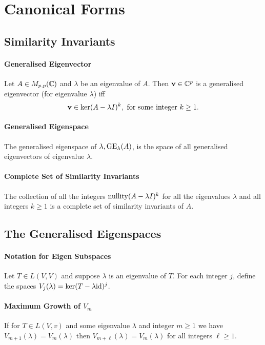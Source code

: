 \section{Canonical Forms}

\subsection{Similarity Invariants}
\paragraph{Generalised Eigenvector}
Let \(A \in M_{p,p}(\mathbb{C})\) and \(\lambda\) be an eigenvalue of \(A\). Then \(\mathbf{v} \in \mathbb{C}^p\) is a generalised eigenvector (for eigenvalue \(\lambda\))
iff
\[\mathbf{v} \in \ker(A - \lambda I)^k, \text{ for some integer } k \geq 1.\]

\paragraph{Generalised Eigenspace}
The generalised eigenspace of \(\lambda, \operatorname{GE}_\lambda(A)\), is the space of all generalised eigenvectors of eigenvalue \(\lambda\).

\paragraph{Complete Set of Similarity Invariants}
The collection of all the integers \(\mathrm{nullity}(A - \lambda I)^k\) for all the eigenvalues \(\lambda\) and all integers \(k \geq 1\) is a complete set of similarity invariants of \(A\).

\subsection{The Generalised Eigenspaces}
\paragraph{Notation for Eigen Subspaces}
Let \(T \in L(V,V)\) and suppose \(\lambda\) is an eigenvalue of \(T\). For each integer \(j\), define the spaces \(V_j(\lambda) = \ker(T - \lambda\mathrm{id})^j\).

\paragraph{Maximum Growth of \(V_m\)}
If for \(T \in L(V,v)\) and some eigenvalue \(\lambda\) and integer \(m \geq 1\) we have \(V_{m+1}(\lambda) = V_m(\lambda)\) then \(V_{m+\ell}(\lambda) = V_m(\lambda)\) for all integers \(\ell \geq  1\).


